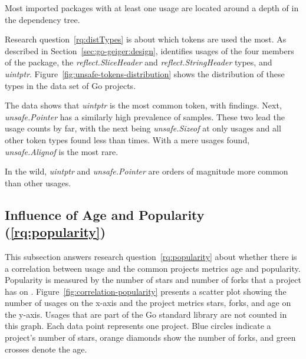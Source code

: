 \begin{answerToRQ}[\ref{rq:depsDepth}]
    Most imported packages with at least one \unsafe{} usage are located around a depth of
    \averageUnsafeImportDepthRounded{} in the dependency tree.
\end{answerToRQ}

Research question~\ref{rq:distTypes} is about which \unsafe{} tokens are used the most.
As described in Section~\ref{sec:go-geiger:design}, \toolGeiger{} identifies usages of the four members of the \unsafe{}
package, the \textit{reflect.SliceHeader} and \textit{reflect.StringHeader} types, and \textit{uintptr}.
Figure~\ref{fig:unsafe-tokens-distribution} shows the distribution of these \unsafe{} types in the data set of Go
projects.



The data shows that \textit{uintptr} is the most common \unsafe{} token, with  findings.
Next, \textit{unsafe.Pointer} has a similarly high prevalence of  samples.
These two lead the usage counts by far, with the next being \textit{unsafe.Sizeof} at only  usages and
all other token types found less than  times.
With a mere  usages found, \textit{unsafe.Alignof} is the most rare.

\begin{answerToRQ}[\ref{rq:distTypes}]
    In the wild, \textit{uintptr} and \textit{unsafe.Pointer} are orders of magnitude more common than other \unsafe{}
    usages.
\end{answerToRQ}



\subsection{Influence of Age and Popularity (\ref{rq:popularity})}\label{subsec:go-geiger:evaluation:popularity}

This subsection answers research question~\ref{rq:popularity} about whether there is a correlation between \unsafe{}
usage and the common projects metrics age and popularity.
Popularity is measured by the number of stars and number of forks that a project has on \github{}.
Figure~\ref{fig:correlation-popularity} presents a scatter plot showing the number of \unsafe{} usages on the x-axis and
the project metrics stars, forks, and age on the y-axis.
Usages that are part of the Go standard library are not counted in this graph.
Each data point represents one project.
Blue circles indicate a project's number of stars, orange diamonds show the number of forks, and green crosses denote
the age.

